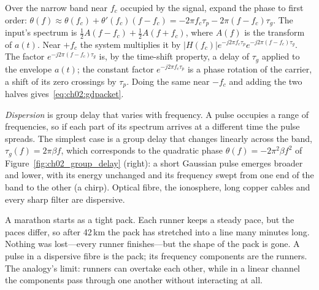 \begin{deeper}
Over the narrow band near $f_c$ occupied by the signal, expand the phase to first order:
$\theta(f)\approx\theta(f_c)+\theta'(f_c)(f-f_c)=-2\pi f_c\tau_p-2\pi(f-f_c)\tau_g$. The input's
spectrum is $\tfrac12A(f-f_c)+\tfrac12A(f+f_c)$, where $A(f)$ is the transform of $a(t)$. Near $+f_c$
the system multiplies it by $|H(f_c)|e^{-j2\pi f_c\tau_p}e^{-j2\pi(f-f_c)\tau_g}$. The factor
$e^{-j2\pi(f-f_c)\tau_g}$ is, by the time-shift property, a delay of $\tau_g$ applied to the
envelope $a(t)$; the constant factor $e^{-j2\pi f_c\tau_p}$ is a phase rotation of the carrier, a
shift of its zero crossings by $\tau_p$. Doing the same near $-f_c$ and adding the two halves
gives~\eqref{eq:ch02:gdpacket}.
\end{deeper}

\emph{Dispersion} is group delay that varies with frequency. A pulse occupies a range of
frequencies, so if each part of its spectrum arrives at a different time the pulse spreads. The
simplest case is a group delay that changes linearly across the band, $\tau_g(f)=2\pi\beta f$,
which corresponds to the quadratic phase $\theta(f)=-2\pi^2\beta f^2$ of
Figure~\ref{fig:ch02_group_delay} (right): a short Gaussian pulse emerges broader and lower, with its
energy unchanged and its frequency swept from one end of the band to the other (a chirp). Optical
fibre, the ionosphere, long copper cables and every sharp filter are dispersive.


\begin{analogy}
A marathon starts as a tight pack. Each runner keeps a steady pace, but the paces differ, so after
42\,km the pack has stretched into a line many minutes long. Nothing was lost---every runner
finishes---but the shape of the pack is gone. A pulse in a dispersive fibre is the pack; its
frequency components are the runners. The analogy's limit: runners can overtake each other, while in
a linear channel the components pass through one another without interacting at all.
\end{analogy}

